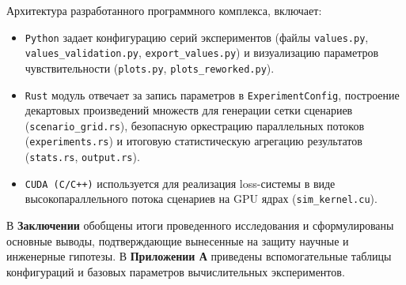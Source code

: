 Архитектура разработанного программного комплекса, включает:
\begin{itemize}
    \item \texttt{Python} задает конфигурацию серий экспериментов (файлы \texttt{values.py}, \texttt{values\_validation.py}, \texttt{export\_values.py}) и визуализацию параметров чувствительности (\texttt{plots.py}, \texttt{plots\_reworked.py}).
    \item \texttt{Rust} модуль отвечает за запись параметров в \texttt{ExperimentConfig}, построение декартовых произведений множеств для генерации сетки сценариев (\texttt{scenario\_grid.rs}), безопасную оркестрацию параллельных потоков (\texttt{experiments.rs}) и итоговую статистическую агрегацию результатов (\texttt{stats.rs}, \texttt{output.rs}).
    \item \texttt{CUDA (C/C++)} используется  для реализация loss-системы в виде высокопараллельного потока сценариев на GPU ядрах (\texttt{sim\_kernel.cu}).
\end{itemize}

В \textbf{Заключении} обобщены итоги проведенного исследования и сформулированы основные выводы, подтверждающие вынесенные на защиту научные и инженерные гипотезы. В \textbf{Приложении А} приведены вспомогательные таблицы конфигураций и базовых параметров вычислительных экспериментов.